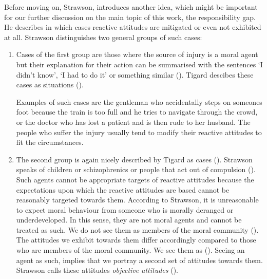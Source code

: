 \documentclass{article}
\begin{document}
Before moving on, Strawson, introduces another idea, which might be important for
our further discussion on the main topic of this work, the responsibility gap.
He describes in which cases reactive attitudes are mitigated or even not
exhibited at all. Strawson distinguishes two general groups of such cases:

\begin{enumerate}
	\item Cases of the first group are those where the source of injury is a
		moral agent but their explanation for their action can be
		summarised with the sentences `I didn't know', `I had to do it'
		or something similar (\cite[p.7-8]{Strawson1962}). Tigard
		descibes these cases as situations  
		(\cite[p.5]{Tigard_2020}).

		Examples of such cases are the gentleman who accidentally steps
		on someones foot because the train is too full and he tries to
		navigate through the crowd, or the doctor who has lost a patient
		and is then rude to her husband. The people who suffer the
		injury usually tend to modify their reactive attitudes to fit
		the circumstances.



	\item The second group is again nicely described by Tigard as cases
		 (\cite[p.5]{Tigard_2020}). Strawson speaks of children
		or schizophrenics or people that act out of compulsion
		(\cite[p.8-9]{Strawson1962}). Such
		agents cannot be appropriate targets of reactive attitudes
		because the expectations upon which the reactive attitudes are
		based cannot be reasonably targeted towards them. According to
		Strawson, it is unreasonable to expect moral behaviour from
		someone who is morally deranged or underdeveloped. In this
		sense, they are not moral agents and cannot be treated as such.
		We do not see them as members of the moral community
		(\cite[p.18]{Strawson1962}). The attitudes we exhibit towards
		them differ accordingly compared to those who are members of the
		moral community. We see them as 
		(\cite[p.8]{Strawson1962}). Seeing an agent as such, implies
		that we portray a second set of attitudes towards them. Strawson
		calls these attitudes \textit{objective attitudes}
		(\cite[p.9]{Strawson1962}). 
\end{enumerate}
\end{document}
